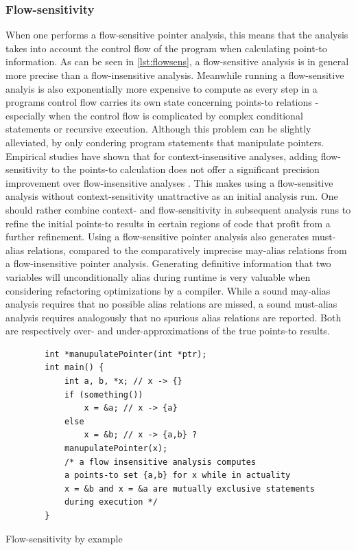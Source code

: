 \subsubsection{Flow-sensitivity}
When one performs a flow-sensitive pointer analysis, this means that the analysis takes into account the control flow of the program when calculating point-to information.
As can be seen in \autoref{lst:flowsens}, a flow-sensitive analysis is in general more precise than a flow-insensitive analysis. Meanwhile running a flow-sensitive analyis is also exponentially more expensive to compute as every step in a programs control flow carries its own state concerning points-to relations - especially when the control flow is complicated by complex conditional statements or recursive execution.
Although this problem can be slightly alleviated, by only condering program statements that manipulate pointers.
Empirical studies have shown that for context-insensitive analyses, adding flow-sensitivity to the points-to calculation does not offer a significant precision improvement over flow-insensitive analyses \cite{hind2001pointer}. This makes using a flow-sensitive analysis without context-sensitivity unattractive as an initial analysis run. One should rather combine context- and flow-sensitivity in subsequent analysis runs to refine the initial points-to results in certain regions of code that profit from a further refinement.
Using a flow-sensitive pointer analysis also generates must-alias relations, compared to the comparatively imprecise may-alias relations from a flow-insensitive pointer analysis.
Generating definitive information that two variables will unconditionally alias during runtime is very valuable when considering refactoring optimizations by a compiler.
While a sound may-alias analysis requires that no possible alias relations are missed, a sound must-alias analysis requires analogously that no spurious alias relations are reported. Both are respectively over- and under-approximations of the true points-to results.

\begin{listing}
    \begin{verbatim}
        int *manupulatePointer(int *ptr);
        int main() {
            int a, b, *x; // x -> {}
            if (something())
                x = &a; // x -> {a}
            else
                x = &b; // x -> {a,b} ?
            manupulatePointer(x);
            /* a flow insensitive analysis computes 
            a points-to set {a,b} for x while in actuality 
            x = &b and x = &a are mutually exclusive statements
            during execution */
        }
    \end{verbatim}
    \caption{Flow-sensitivity by example}
    \label{lst:flowsens}
\end{listing}

